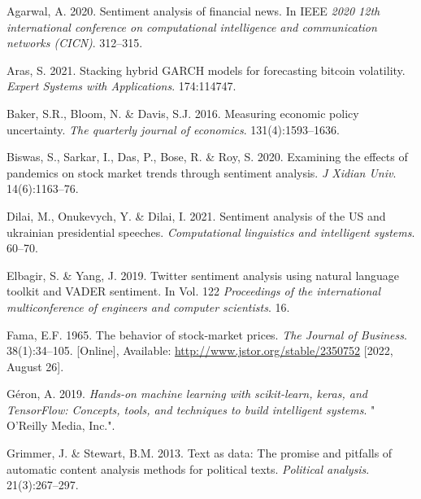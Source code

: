 \documentclass[11pt,preprint, authoryear]{elsarticle}
\numberwithin{equation}{section}
\numberwithin{figure}{section}
\numberwithin{table}{section}
\newlength{\cslhangindent}
\newenvironment{CSLReferences}%
  {\setlength{\parindent}{0pt}%
  \everypar{\setlength{\hangindent}{\cslhangindent}}\ignorespaces}%
  {\par}
\begin{document}
\hypertarget{refs}{}
\begin{CSLReferences}
\leavevmode{}%
Agarwal, A. 2020. Sentiment analysis of financial news. In IEEE
\emph{2020 12th international conference on computational intelligence
and communication networks (CICN)}. 312--315.

\leavevmode{}%
Aras, S. 2021. Stacking hybrid GARCH models for forecasting bitcoin
volatility. \emph{Expert Systems with Applications}. 174:114747.

\leavevmode{}%
Baker, S.R., Bloom, N. \& Davis, S.J. 2016. Measuring economic policy
uncertainty. \emph{The quarterly journal of economics}.
131(4):1593--1636.

\leavevmode{}%
Biswas, S., Sarkar, I., Das, P., Bose, R. \& Roy, S. 2020. Examining the
effects of pandemics on stock market trends through sentiment analysis.
\emph{J Xidian Univ}. 14(6):1163--76.

\leavevmode{}%
Dilai, M., Onukevych, Y. \& Dilai, I. 2021. Sentiment analysis of the US
and ukrainian presidential speeches. \emph{Computational linguistics and
intelligent systems}. 60--70.

\leavevmode{}%
Elbagir, S. \& Yang, J. 2019. Twitter sentiment analysis using natural
language toolkit and VADER sentiment. In Vol. 122 \emph{Proceedings of
the international multiconference of engineers and computer scientists}.
16.

\leavevmode{}%
Fama, E.F. 1965. The behavior of stock-market prices. \emph{The Journal
of Business}. 38(1):34--105. {[}Online{]}, Available:
\url{http://www.jstor.org/stable/2350752} {[}2022, August 26{]}.

\leavevmode{}%
Géron, A. 2019. \emph{Hands-on machine learning with scikit-learn,
keras, and TensorFlow: Concepts, tools, and techniques to build
intelligent systems}. " O'Reilly Media, Inc.".

\leavevmode{}%
Grimmer, J. \& Stewart, B.M. 2013. Text as data: The promise and
pitfalls of automatic content analysis methods for political texts.
\emph{Political analysis}. 21(3):267--297.


\end{CSLReferences}
\end{document}
